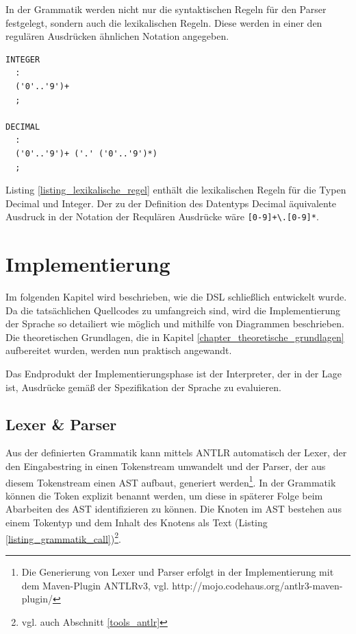 In der Grammatik werden nicht nur die syntaktischen Regeln für den Parser festgelegt, sondern auch die lexikalischen Regeln. Diese werden in einer den regulären Ausdrücken ähnlichen Notation angegeben.

\begin{lstlisting}[float = htbp,caption={Lexikalische Regel für Token INTEGER und DECIMAL},label=listing_lexikalische_regel]
INTEGER
  :
  ('0'..'9')+ 
  ;

DECIMAL
  :
  ('0'..'9')+ ('.' ('0'..'9')*)
  ;
\end{lstlisting}

Listing \ref{listing_lexikalische_regel} enthält die lexikalischen Regeln für die Typen Decimal und Integer. Der zu der Definition des Datentyps Decimal äquivalente Ausdruck in der Notation der Requlären Ausdrücke wäre \texttt{[0-9]+\textbackslash .[0-9]*}.


\chapter{Implementierung}
\label{chapter_implementierung}

Im folgenden Kapitel wird beschrieben, wie die DSL schließlich entwickelt wurde. Da die tatsächlichen Quellcodes zu umfangreich sind, wird die Implementierung der Sprache so detailiert wie möglich und mithilfe von Diagrammen beschrieben. Die theoretischen Grundlagen, die in Kapitel \ref{chapter_theoretische_grundlagen} aufbereitet wurden, werden nun praktisch angewandt.

Das Endprodukt der Implementierungsphase ist der Interpreter, der in der Lage ist, Ausdrücke gemäß der Spezifikation der Sprache zu evaluieren.


\section{Lexer \& Parser}

Aus der definierten Grammatik kann mittels ANTLR automatisch der Lexer, der den Eingabestring in einen Tokenstream umwandelt und der Parser, der aus diesem Tokenstream einen AST aufbaut, generiert werden\footnote{Die Generierung von Lexer und Parser erfolgt in der Implementierung mit dem Maven-Plugin ANTLRv3, vgl. http://mojo.codehaus.org/antlr3-maven-plugin/}. In der Grammatik können die Token explizit benannt werden, um diese in späterer Folge beim Abarbeiten des AST identifizieren zu können. Die Knoten im AST bestehen aus einem Tokentyp und dem Inhalt des Knotens als Text (Listing \ref{listing_grammatik_call})\footnote{vgl. auch Abschnitt \ref{tools_antlr}}. 


